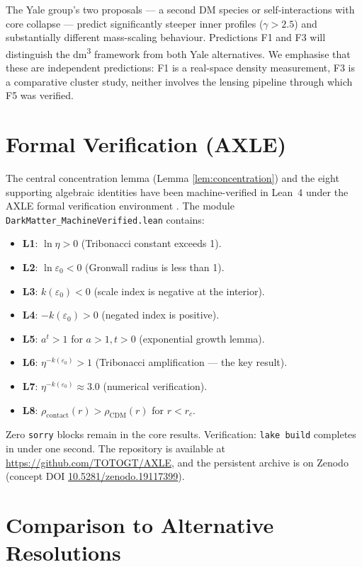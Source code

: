 \documentclass[11pt,a4paper]{article}
\theoremstyle{definition}
\theoremstyle{remark}
\begin{document}
The Yale group's two proposals --- a second DM species or self-interactions with core collapse --- predict significantly steeper inner profiles ($\gamma > 2.5$) and substantially different mass-scaling behaviour. Predictions F1 and F3 will distinguish the dm\textsuperscript{3} framework from both Yale alternatives. We emphasise that these are independent predictions: F1 is a real-space density measurement, F3 is a comparative cluster study, neither involves the lensing pipeline through which F5 was verified.

\section{Formal Verification (AXLE)}
\label{sec:verification}

The central concentration lemma (Lemma \ref{lem:concentration}) and the eight supporting algebraic identities have been machine-verified in Lean~4 under the AXLE formal verification environment \citep{AXLE2026}. The module \texttt{DarkMatter\_MachineVerified.lean} contains:
\begin{itemize}
\item \textbf{L1}: $\ln \eta > 0$ (Tribonacci constant exceeds 1).
\item \textbf{L2}: $\ln \varepsilon_0 < 0$ (Gronwall radius is less than 1).
\item \textbf{L3}: $k(\varepsilon_0) < 0$ (scale index is negative at the interior).
\item \textbf{L4}: $-k(\varepsilon_0) > 0$ (negated index is positive).
\item \textbf{L5}: $a^t > 1$ for $a > 1, t > 0$ (exponential growth lemma).
\item \textbf{L6}: $\eta^{-k(\varepsilon_0)} > 1$ (Tribonacci amplification --- the key result).
\item \textbf{L7}: $\eta^{-k(\varepsilon_0)} \approx 3.0$ (numerical verification).
\item \textbf{L8}: $\rho_{\mathrm{contact}}(r) > \rho_{\mathrm{CDM}}(r)$ for $r < r_c$.
\end{itemize}
Zero \texttt{sorry} blocks remain in the core results. Verification: \texttt{lake build} completes in under one second. The repository is available at \url{https://github.com/TOTOGT/AXLE}, and the persistent archive is on Zenodo (concept DOI \href{https://doi.org/10.5281/zenodo.19117399}{10.5281/zenodo.19117399}).

\section{Comparison to Alternative Resolutions}
\label{sec:comparison}
\end{document}
